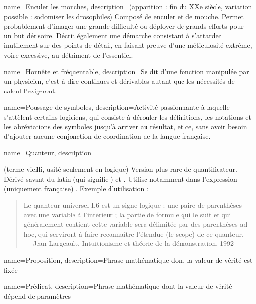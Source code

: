 


{
	name=Enculer les mouches,
	description={(apparition : fin du XXe siècle, variation possible : sodomiser les drosophiles) Composé de enculer et de mouche. Permet probablement d'imager une grande difficulté ou déployer de grands efforts pour un but dérisoire. Décrit également une démarche consistant à s'attarder inutilement sur des points de détail, en faisant preuve d'une méticulosité extrême, voire excessive, au détriment de l'essentiel.}
}

{
	name=Honnête et fréquentable,
	description={Se dit d'une fonction manipulée par un physicien, c'est-à-dire continues et dérivables autant que les nécessités de calcul l'exigeront.}
}

{
	name=Poussage de symboles,
	description={Activité passionnante à laquelle s'attèlent certains logiciens, qui consiste à dérouler les définitions, les notations et les abréviations des symboles jusqu'à arriver au résultat, et ce, sans avoir besoin d'ajouter aucune conjonction de coordination de la langue française.}
}

{
	name=Quanteur,
	description={(terme vieilli, usité seulement en logique) Version plus rare de quantificateur. Dérivé savant du latin  (qui signifie ) et . Utilisé notamment dans l'expression (uniquement française) . Exemple d'utilisation : \begin{quote}
		Le quanteur universel I.6 est un signe logique : une paire de parenthèses avec une variable à l'intérieur ; la partie de formule qui le suit et qui généralement contient cette variable sera délimitée par des parenthèses ad hoc, qui serviront à faire reconnaître l’étendue (le scope) de ce quanteur.\\
		--- Jean Largeault, Intuitionisme et théorie de la démonstration, 1992
	\end{quote}}
}

{
        name=Proposition,
        description={Phrase mathématique dont la valeur de vérité est fixée}}

{
        name=Prédicat,
        description={Phrase mathématique dont la valeur de vérité dépend de paramètres}}
